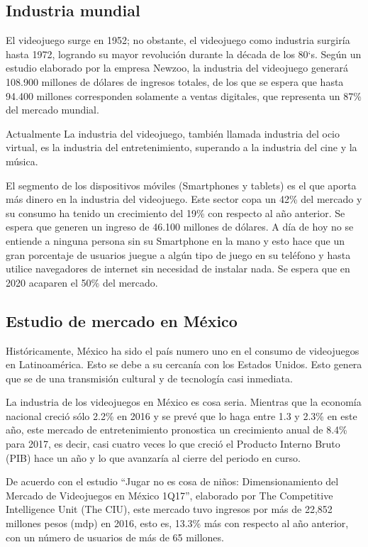 \documentclass{article}
\begin{document}
			\subsection{Industria mundial}
			 
			 El videojuego surge en 1952; no obstante, el videojuego como industria surgiría hasta 1972, logrando su mayor revolución durante la década de los 80`s. 
			 Según un estudio elaborado por la empresa Newzoo, la industria del videojuego generará 108.900 millones de dólares de ingresos totales, de los que se espera que hasta 94.400 millones corresponden solamente a ventas digitales, que representa un 87\% del mercado mundial.
			 
			 Actualmente La industria del videojuego, también llamada industria del ocio virtual, es la industria del entretenimiento, superando a la industria del cine y la música.	
			 
			 El segmento de los dispositivos móviles (Smartphones y tablets) es el que aporta más dinero en la industria del videojuego. Este sector copa un 42\% del mercado y su consumo ha tenido un crecimiento del 19\% con respecto al año anterior. Se espera que generen un ingreso de 46.100 millones de dólares. A día de hoy no se entiende a ninguna persona sin su Smartphone en la mano y esto hace que un gran porcentaje de usuarios juegue a algún tipo de juego en su teléfono y hasta utilice navegadores de internet sin necesidad de instalar nada. Se espera que en 2020 acaparen el 50\% del mercado.
			 
\subsection{Estudio de mercado en México}

Históricamente, México ha sido el país numero uno en el consumo de videojuegos en Latinoamérica. Esto se debe a su cercanía con los Estados Unidos. Esto genera que se de una transmisión cultural y de tecnología casi inmediata.

La industria de los videojuegos en México es cosa seria. Mientras que la economía nacional creció sólo 2.2\% en 2016 y se prevé que lo haga entre 1.3 y 2.3\% en este año, este mercado de entretenimiento pronostica un crecimiento anual de 8.4\% para 2017, es decir, casi cuatro veces lo que creció el Producto Interno Bruto (PIB) hace un año y lo que avanzaría al cierre del periodo en curso.

De acuerdo con el estudio “Jugar no es cosa de niños: Dimensionamiento del Mercado de Videojuegos en México 1Q17”, elaborado por The Competitive Intelligence Unit (The CIU), este mercado tuvo ingresos por más de 22,852 millones pesos (mdp) en 2016, esto es, 13.3\% más con respecto al año anterior, con un número de usuarios de más de 65 millones.
\end{document}
